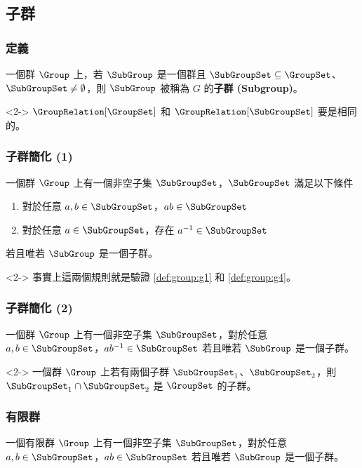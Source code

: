 \documentclass[utf8]{beamer}
\begin{document}
\begin{CJK}{UTF8}{bkai}
\section{子群}

\begin{frame}
  \frametitle{定義}
  \begin{mydef}[子群]
  \label{def:group:subgroup}
  一個群 $\Group$ 上，若 $\SubGroup$ 是一個群且 $\SubGroupSet\subseteq{\GroupSet}$、$\SubGroupSet\neq{\emptyset}$，則 $\SubGroup$ 被稱為 $G$ 的\textbf{子群 (Subgroup)}。
  \end{mydef}
  \begin{mynote*}<2->
  $\GroupRelation[\GroupSet]$ 和 $\GroupRelation[\SubGroupSet]$ 要是相同的。
  \end{mynote*}
\end{frame}

\begin{frame}
  \frametitle{子群簡化 (1)}
  \begin{mylma}[實用版子群]
  \label{lma:group:two_rule_subgroup}
  一個群 $\Group$ 上有一個非空子集 $\SubGroupSet$，$\SubGroupSet$ 滿足以下條件
  \begin{enumerate}
  \item 對於任意 $a,b\in{\SubGroupSet}$，$ab\in{\SubGroupSet}$
  \item 對於任意 $a\in{\SubGroupSet}$，存在 $a^{-1}\in{\SubGroupSet}$
  \end{enumerate}
  若且唯若 $\SubGroup$ 是一個子群。
  \end{mylma}
  \begin{mynote*}<2->
  事實上這兩個規則就是驗證 \ref{def:group:g1} 和 \ref{def:group:g4}。
  \end{mynote*}
\end{frame}

\begin{frame}
  \frametitle{子群簡化 (2)}
  \begin{mylma}[精簡版子群]
  \label{lma:group:one_rule_subgroup}
  一個群 $\Group$ 上有一個非空子集 $\SubGroupSet$，對於任意 $a,b\in{\SubGroupSet}$，$ab^{-1}\in{\SubGroupSet}$ 若且唯若 $\SubGroup$ 是一個子群。
  \end{mylma}
  \begin{mypropo}<2->
  \label{pro:group:two_subgroup_intersection}
  一個群 $\Group$ 上若有兩個子群 $\SubGroupSet_1$、$\SubGroupSet_2$，則 ${\SubGroupSet_1}\cap{\SubGroupSet_2}$ 是 $\GroupSet$ 的子群。
  \end{mypropo}
\end{frame}

\begin{frame}
  \frametitle{有限群}
  \begin{mythm}[有限子群]
  一個有限群 $\Group$ 上有一個非空子集 $\SubGroupSet$，對於任意 $a,b\in{\SubGroupSet}$，$ab\in{\SubGroupSet}$ 若且唯若 $\SubGroup$ 是一個子群。
  \end{mythm}
\end{frame}

\end{CJK}
\end{document}
